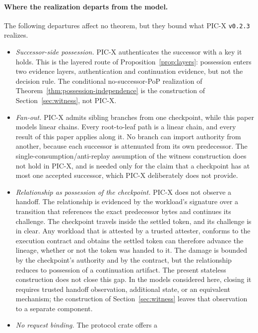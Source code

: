 \documentclass[10pt,twocolumn]{article}
\begin{document}
\paragraph{Where the realization departs from the model.}
The following departures affect no theorem, but they bound what PIC-X
\texttt{v0.2.3} realizes.
\begin{itemize}
    \item \emph{Successor-side possession.} PIC-X authenticates the successor
    with a key it holds. This is the layered route of
    Proposition~\ref{prop:layers}: possession enters two evidence layers,
    authentication and continuation evidence, but not the decision rule. The
    conditional no-successor-PoP
    realization of Theorem~\ref{thm:possession-independence} is the construction
    of Section~\ref{sec:witness}, not PIC-X.
    \item \emph{Fan-out.} PIC-X admits sibling branches from one checkpoint,
    while this paper models linear chains. Every root-to-leaf path is a linear
    chain, and every result of this paper applies along it. No branch can import
    authority from another, because each successor is attenuated from its own
    predecessor. The single-consumption/anti-replay assumption of the witness
    construction does not hold in PIC-X, and is needed only for the claim that
    a checkpoint has at most one accepted successor, which PIC-X deliberately
    does not provide.
    \item \emph{Relationship as possession of the checkpoint.} PIC-X does not
    observe a handoff. The relationship is evidenced by the workload's signature
    over a transition that references the exact predecessor bytes and continues
    its challenge. The checkpoint travels inside the settled token, and its
    challenge is in clear. Any workload that is attested by a trusted attester,
    conforms to the execution contract and obtains the settled token can
    therefore advance the lineage, whether or not the token was handed to it.
    The damage is bounded by the checkpoint's authority and by the contract,
    but the relationship reduces to possession of a continuation artifact. The
    present stateless construction does not close this gap. In the models
    considered here, closing it requires trusted handoff observation, additional
    state, or an equivalent mechanism; the construction of
    Section~\ref{sec:witness} leaves that observation to a separate component.
    \item \emph{No request binding.} The protocol crate offers a

\end{itemize}
\end{document}

